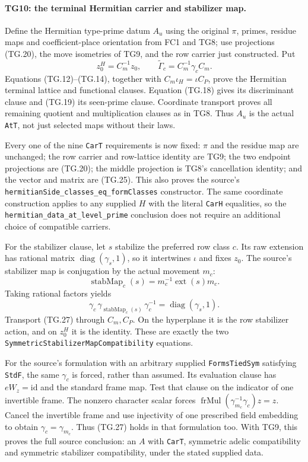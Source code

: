 \paragraph{TG10: the terminal Hermitian carrier and stabilizer map.}
Define the Hermitian type-prime datum $A_u$ using the original
$\pi$, primes, residue maps and coefficient-place orientation
from FC1 and TG8; use projections (TG.20), the move isometries
of TG9, and the row carrier just constructed. Put
\[
 z_0^H=C_m^{-1}z_0,\qquad
 \widetilde\Gamma_c=C_m^{-1}\gamma_c C_m.
 \tag{TG.25}
\]
Equations (TG.12)--(TG.14), together with
$C_m\iota_H=\iota C_P$, prove the Hermitian terminal lattice
and functional clauses. Equation (TG.18) gives its discriminant
clause and (TG.19) its seen-prime clause. Coordinate transport
proves all remaining quotient and multiplication clauses as in
TG8. Thus $A_u$ is the actual \texttt{AtT}, not just selected
maps without their laws.

Every one of the nine \texttt{CarT} requirements is now fixed:
$\pi$ and the residue map are unchanged; the row carrier and
row-lattice identity are TG9; the two endpoint projections are
(TG.20); the middle projection is TG8's cancellation identity;
and the vector and matrix are (TG.25). This also proves the
source's \texttt{hermitianSide\_classes\_eq\_formClasses}
constructor. The same coordinate construction applies to any
supplied $H$ with the literal \texttt{CarH} equalities, so the
\texttt{hermitian\_data\_at\_level\_prime} conclusion does
not require an additional choice of compatible carriers.

For the stabilizer clause, let $s$ stabilize the preferred row
class $c$. Its raw extension has rational matrix
$\operatorname{diag}(\gamma_s,1)$, so it intertwines $\iota$
and fixes $z_0$. The source's stabilizer map is conjugation by
the actual movement $m_c$:
\[
 \operatorname{stabMap}_c(s)=m_c^{-1}\operatorname{ext}(s)m_c.
 \tag{TG.26}
\]
Taking rational factors yields
\[
 \gamma_c\,\gamma_{\operatorname{stabMap}_c(s)}\,
                      \gamma_c^{-1}
       =\operatorname{diag}(\gamma_s,1).
 \tag{TG.27}
\]
Transport (TG.27) through $C_m,C_P$. On the hyperplane it is
the row stabilizer action, and on $z_0^H$ it is the identity.
These are exactly the two
\texttt{SymmetricStabilizerMapCompatibility} equations.

For the source's formulation with an arbitrary supplied
\texttt{FormsTiedSym} satisfying \texttt{StdF}, the same
$\gamma_c$ is forced, rather than assumed. Its evaluation
clause has $eW_z=\mathrm{id}$ and the standard frame map.
Test that clause on the indicator of one invertible frame.
The nonzero character scalar forces
$\operatorname{frMul}(\gamma_{m_c}^{-1}\gamma_c)z=z$.
Cancel the invertible frame and use injectivity of one prescribed
field embedding to obtain $\gamma_c=\gamma_{m_c}$. Thus
(TG.27) holds in that formulation too. With TG9, this proves
the full source conclusion: an $A$ with \texttt{CarT},
symmetric adelic compatibility and symmetric stabilizer
compatibility, under the stated supplied data.

